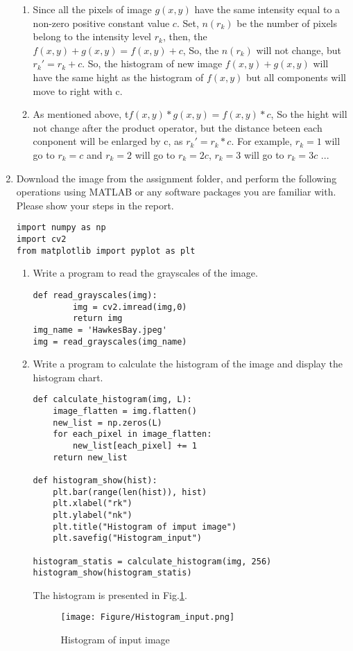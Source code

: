 \documentclass[12pt]{article}
\begin{document}
\begin{enumerate}[leftmargin=\labelsep]
\begin{enumerate}
        \item Since all the pixels of image $g(x,y)$ have the same intensity equal to a non-zero positive constant value $c$. 
        Set, $n(r_k)$ be the number of pixels belong to the intensity level $r_k$, then, the $f(x,y) + g(x,y) = f(x,y) + c$, So, the $n(r_k)$ will not change, but $r_k' = r_k + c$. 
        So, the histogram of new image $f(x,y)+g(x,y)$ will have the same hight as the histogram of $f(x,y)$ but all components will move to right with c.
        \item As mentioned above, t$f(x,y) * g(x,y) = f(x,y) * c$, So the hight will not change after the product operator, but the distance beteen each conponent will be enlarged by c, as $r_k' = r_k * c$. 
        For example, $r_k = 1$ will go to $r_k = c$ and $r_k = 2$ will go to $r_k = 2c$, $r_k = 3$ will go to $r_k = 3c$ ...
\end{enumerate}

\item Download the image from the assignment folder, and perform the following operations using MATLAB or any software packages you are familiar with. Please show your steps in the report.
\begin{lstlisting}
import numpy as np
import cv2
from matplotlib import pyplot as plt
\end{lstlisting}

        \begin{enumerate}
                \item Write a program to read the grayscales of the image.
\begin{lstlisting}
def read_grayscales(img):
        img = cv2.imread(img,0)
        return img
img_name = 'HawkesBay.jpeg'
img = read_grayscales(img_name)
\end{lstlisting}
                \item Write a program to calculate the histogram of the image and display the histogram chart.
\begin{lstlisting}
def calculate_histogram(img, L):
    image_flatten = img.flatten()
    new_list = np.zeros(L)
    for each_pixel in image_flatten:
        new_list[each_pixel] += 1
    return new_list 
        
def histogram_show(hist):
    plt.bar(range(len(hist)), hist)
    plt.xlabel("rk")
    plt.ylabel("nk")
    plt.title("Histogram of imput image")
    plt.savefig("Histogram_input")

histogram_statis = calculate_histogram(img, 256)
histogram_show(histogram_statis)
\end{lstlisting}
                The histogram is presented in Fig.\ref{q5_hist_input}.
                \begin{figure}[H]
                \centering
                \texttt{[image: Figure/Histogram\_input.png]}
                \caption{Histogram of input image}
                \label{q5_hist_input}
                \end{figure}
        


\end{enumerate}
\end{enumerate}
\end{document}
